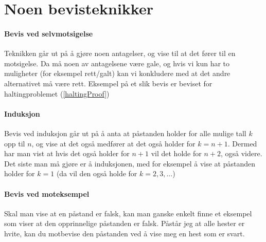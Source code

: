 \section{Noen bevisteknikker}

\paragraph{Bevis ved selvmotsigelse}
Teknikken går ut på å gjøre noen antagelser, og vise til at det fører til en motsigelse. Da må noen av antagelsene være gale, og hvis vi kun har to muligheter (for eksempel rett/galt) kan vi konkludere med at det andre alternativet må være rett. Eksempel på et slik bevis er beviset for haltingproblemet (\ref{haltingProof})

\paragraph{Induksjon}
Bevis ved induksjon går ut på å anta at påstanden holder for alle mulige tall $ k $ opp til $ n $, og vise at det også medfører at det også holder for $ k = n+1 $. Dermed har man vist at hvis det også holder for $ n+1 $ vil det holde for $ n+2 $, også videre. Det siste man må gjøre er å  induksjonen, med for eksempel å vise at påstanden holder for $ k=1 $ (da vil den også holde for $ k=2, 3, ... $)

\paragraph{Bevis ved moteksempel}
Skal man vise at en påstand er falsk, kan man ganske enkelt finne et eksempel som viser at den opprinnelige påstanden er falsk. Påstår jeg at alle hester er hvite, kan du motbevise den påstanden ved å vise meg en hest som er svart.

